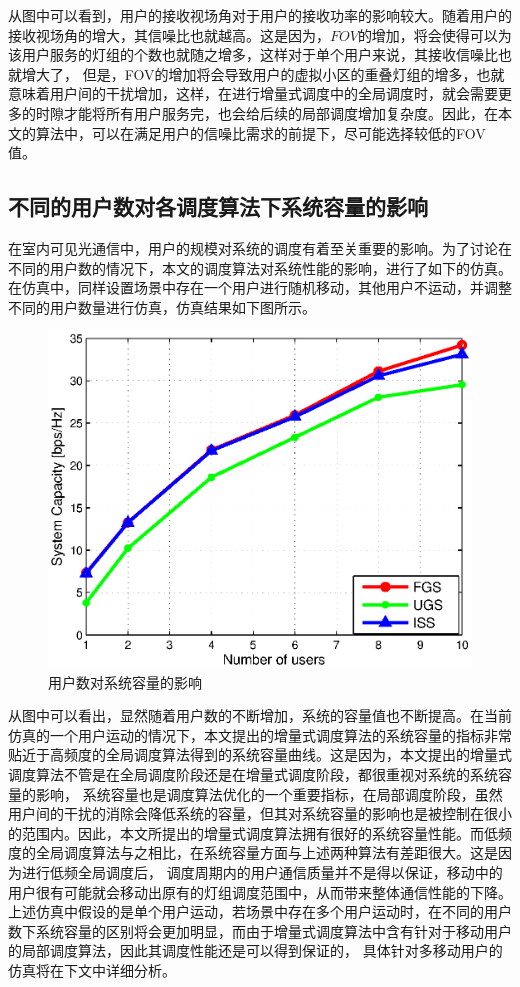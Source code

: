 从图中可以看到，用户的接收视场角对于用户的接收功率的影响较大。随着用户的接收视场角的增大，其信噪比也就越高。这是因为，$FOV$的增加，将会使得可以为该用户服务的灯组的个数也就随之增多，这样对于单个用户来说，其接收信噪比也就增大了，
但是，FOV的增加将会导致用户的虚拟小区的重叠灯组的增多，也就意味着用户间的干扰增加，这样，在进行增量式调度中的全局调度时，就会需要更多的时隙才能将所有用户服务完，也会给后续的局部调度增加复杂度。因此，在本文的算法中，可以在满足用户的信噪比需求的前提下，尽可能选择较低的FOV值。

\subsection{不同的用户数对各调度算法下系统容量的影响}
在室内可见光通信中，用户的规模对系统的调度有着至关重要的影响。为了讨论在不同的用户数的情况下，本文的调度算法对系统性能的影响，进行了如下的仿真。
在仿真中，同样设置场景中存在一个用户进行随机移动，其他用户不运动，并调整不同的用户数量进行仿真，仿真结果如下图所示。

\begin{figure}[htbp]
    \centering
	\includegraphics[width=\textwidth]{figures/chapter-5/Usernum2Capacity.eps}
	\caption{用户数对系统容量的影响}
	\label{fig:usernum-2-capacity}
\end{figure}

从图中可以看出，显然随着用户数的不断增加，系统的容量值也不断提高。在当前仿真的一个用户运动的情况下，本文提出的增量式调度算法的系统容量的指标非常贴近于高频度的全局调度算法得到的系统容量曲线。这是因为，本文提出的增量式调度算法不管是在全局调度阶段还是在增量式调度阶段，都很重视对系统的系统容量的影响，
系统容量也是调度算法优化的一个重要指标，在局部调度阶段，虽然用户间的干扰的消除会降低系统的容量，但其对系统容量的影响也是被控制在很小的范围内。因此，本文所提出的增量式调度算法拥有很好的系统容量性能。而低频度的全局调度算法与之相比，在系统容量方面与上述两种算法有差距很大。这是因为进行低频全局调度后，
调度周期内的用户通信质量并不是得以保证，移动中的用户很有可能就会移动出原有的灯组调度范围中，从而带来整体通信性能的下降。上述仿真中假设的是单个用户运动，若场景中存在多个用户运动时，在不同的用户数下系统容量的区别将会更加明显，而由于增量式调度算法中含有针对于移动用户的局部调度算法，因此其调度性能还是可以得到保证的，
具体针对多移动用户的仿真将在下文中详细分析。

